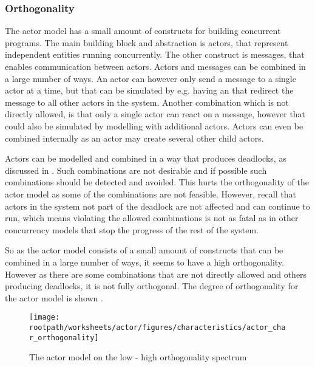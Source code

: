 \subsubsection{Orthogonality}\label{sec:actor_orthogonality}
The actor model has a small amount of constructs for building concurrent programs. The main building block and abstraction is actors, that represent independent entities running concurrently. The other construct is messages, that enables communication between actors. Actors and messages can be combined in a large number of ways. An actor can however only send a message to a single actor at a time, but that can be simulated by e.g. having an  that redirect the message to all other actors in the system. Another combination which is not directly allowed, is that only a single actor can react on a message, however that could also be simulated by modelling with additional actors. Actors can even be combined internally as an actor may create several other child actors.

Actors can be modelled and combined in a way that produces deadlocks, as discussed in . Such combinations are not desirable and if possible such combinations should be detected and avoided. This hurts the orthogonality of the actor model as some of the combinations are not feasible. However, recall that actors in the system not part of the deadlock are not affected and can continue to run, which means violating the allowed combinations is not as fatal as in other concurrency models that stop the progress of the rest of the system.

So as the actor model consists of a small amount of constructs that can be combined in a large number of ways, it seems to have a high orthogonality. However as there are some combinations that are not directly allowed and others producing deadlocks, it is not fully orthogonal. The degree of orthogonality for the actor model is shown .


\begin{figure}[htbp]
\centering
 \texttt{[image: \\rootpath/worksheets/actor/figures/characteristics/actor\_char\_orthogonality]} 
 \caption{The actor model on the low - high orthogonality spectrum}
\label{fig:actor_orthogonality}
\end{figure}

